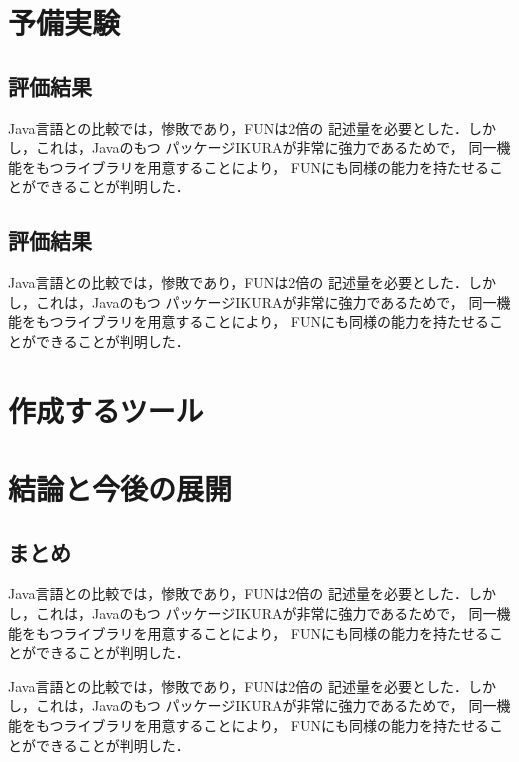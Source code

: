 \documentclass{funthesis}
\begin{document}
\chapter{予備実験}%

\section{評価結果}

Java言語との比較では，惨敗であり，FUNは2倍の
記述量を必要とした．しかし，これは，Javaのもつ
パッケージIKURAが非常に強力であるためで，
同一機能をもつライブラリを用意することにより，
FUNにも同様の能力を持たせることができることが判明した．

\section{評価結果}

Java言語との比較では，惨敗であり，FUNは2倍の
記述量を必要とした．しかし，これは，Javaのもつ
パッケージIKURAが非常に強力であるためで，
同一機能をもつライブラリを用意することにより，
FUNにも同様の能力を持たせることができることが判明した．

\chapter{作成するツール}%


\chapter{結論と今後の展開}%

\section{まとめ}

Java言語との比較では，惨敗であり，FUNは2倍の
記述量を必要とした．しかし，これは，Javaのもつ
パッケージIKURAが非常に強力であるためで，
同一機能をもつライブラリを用意することにより，
FUNにも同様の能力を持たせることができることが判明した．

Java言語との比較では，惨敗であり，FUNは2倍の
記述量を必要とした．しかし，これは，Javaのもつ
パッケージIKURAが非常に強力であるためで，
同一機能をもつライブラリを用意することにより，
FUNにも同様の能力を持たせることができることが判明した．
\end{document}
